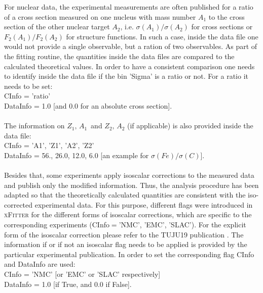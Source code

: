 \documentclass{article}
\begin{document}
For nuclear data, the experimental measurements are often published for a ratio of a cross section measured on one nucleus with mass number $A_1$ to the cross section of the other nuclear target $A_2$, i.e. $\sigma(A_1)/\sigma(A_2)$ for cross sections or $F_2(A_1)/F_2(A_2)$ for structure functions. In such a case, inside the data file one would not provide a single observable, but a ration of two observables. As part of the fitting routine, the quantities inside the data files are compared to the calculated theoretical values. In order to have a consistent comparison one needs to identify inside the data file if the bin 'Sigma' is a ratio or not. For a ratio it needs to be set:\\
\hspace*{0.5cm}CInfo = 'ratio'\\
\hspace*{0.5cm}DataInfo = 1.0 [and 0.0 for an absolute cross section].\\
\\
The information on $Z_1,\,A_1\,$ and $Z_2,\,A_2$ (if applicable) is also provided inside the data file:\\
\hspace*{0.5cm}CInfo = 'A1', 'Z1', 'A2', 'Z2'\\
\hspace*{0.5cm}DataInfo = 56., 26.0, 12.0, 6.0 [an example for $\sigma(Fe)/\sigma(C)$].\\
\\
Besides that, some experiments apply isoscalar corrections to the measured data and publish only the modified information. Thus, the analysis procedure has been adapted so that the theoretically calculated quantities are consistent with the iso-corrected experimental data. For this purpose, different flags were introduced in \textsc{xFitter} for the different forms of isoscalar corrections, which are specific to the corresponding experiments (CInfo$=$'NMC', 'EMC', 'SLAC'). For the explicit form of the isoscalar correction please refer to the TUJU19 publication \cite{tuju19}. The information if or if not an isoscalar flag needs to be applied is provided by the particular experimental publication. In order to set the corresponding flag CInfo and DataInfo are used:\\
\hspace*{0.5cm}CInfo = 'NMC' [or 'EMC' or 'SLAC' respectively]\\
\hspace*{0.5cm}DataInfo = 1.0 [if True, and 0.0 if False].\\
\end{document}

